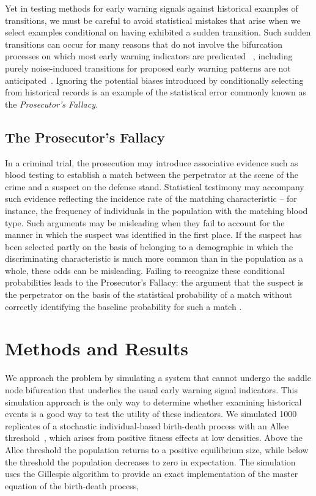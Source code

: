 \documentclass[authoryear,review,12pt]{elsarticle}
\begin{document}
Yet in testing methods for early warning signals against historical examples of
transitions, we must be careful to avoid statistical mistakes that arise when
we select examples conditional on having exhibited a sudden transition.  Such
sudden transitions can occur for many reasons that do not involve the 
bifurcation processes on which most early warning indicators are predicated
~\citep{Hastings2010}, including purely noise-induced transitions for proposed 
early warning patterns are not anticipated~\citep{Ditlevsen2010, Lenton2011}. 
Ignoring the potential biases introduced by conditionally selecting from 
historical records is an example of the statistical error commonly known as the
\emph{Prosecutor's Fallacy.}

\subsection*{The Prosecutor's Fallacy}


In a criminal trial, the prosecution may introduce associative evidence such as 
blood testing to establish a match between the perpetrator at the scene of the
crime and a suspect on the defense stand.  Statistical testimony may accompany 
such evidence reflecting the incidence rate of the matching characteristic -- 
for instance, the frequency of individuals in the population with the matching
blood type.  Such arguments may be misleading when they fail to account for  
the manner in which the suspect was identified in 
the first place.  If the suspect has been selected partly on the basis of 
belonging to a demographic in which the discriminating characteristic is much more common than
in the population as a whole, these odds can be misleading.  Failing to recognize 
these conditional probabilities leads to the Prosecutor's Fallacy: the 
argument that the suspect is the perpetrator on the basis of the statistical 
probability of a match without correctly identifying the baseline probability 
for such a match \citep{Thompson1987}.


\section{Methods and Results}
We approach the problem by simulating a system that cannot undergo the
saddle node bifurcation that underlies the usual early warning signal
indicators.  This simulation approach is the only way to determine whether
examining historical events is a good way to test the utility of these
indicators.  We simulated 1000 replicates of a stochastic individual-based
birth-death process with an Allee threshold~\citep{Courchamp2008}, which
arises from positive fitness effects at low densities.  Above the Allee
threshold the population returns to a positive equilibrium size, while
below the threshold the population decreases to zero in expectation. The
simulation uses the Gillespie algorithm to provide an exact implementation
of the master equation of the birth-death process,
\end{document}
